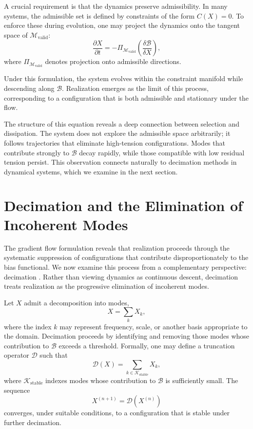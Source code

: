 \documentclass[11pt]{article}
\theoremstyle{plain}
\theoremstyle{definition}
\theoremstyle{remark}
\begin{document}
A crucial requirement is that the dynamics preserve admissibility. In many systems, the admissible set is defined by constraints of the form $C(X) = 0$. To enforce these during evolution, one may project the dynamics onto the tangent space of $\mathcal{M}_{\mathrm{valid}}$:
\[
\frac{\partial X}{\partial t} = - \Pi_{\mathcal{M}_{\mathrm{valid}}} \left( \frac{\delta \mathcal{B}}{\delta X} \right),
\]
where $\Pi_{\mathcal{M}_{\mathrm{valid}}}$ denotes projection onto admissible directions.

Under this formulation, the system evolves within the constraint manifold while descending along $\mathcal{B}$. Realization emerges as the limit of this process, corresponding to a configuration that is both admissible and stationary under the flow.

The structure of this equation reveals a deep connection between selection and dissipation. The system does not explore the admissible space arbitrarily; it follows trajectories that eliminate high-tension configurations. Modes that contribute strongly to $\mathcal{B}$ decay rapidly, while those compatible with low residual tension persist. This observation connects naturally to decimation methods in dynamical systems, which we examine in the next section.

\section{Decimation and the Elimination of Incoherent Modes}

The gradient flow formulation reveals that realization proceeds through the systematic suppression of configurations that contribute disproportionately to the bias functional. We now examine this process from a complementary perspective: decimation \cite{Grimm2026}. Rather than viewing dynamics as continuous descent, decimation treats realization as the progressive elimination of incoherent modes.

Let $X$ admit a decomposition into modes,
\[
X = \sum_{k} X_k,
\]
where the index $k$ may represent frequency, scale, or another basis appropriate to the domain. Decimation proceeds by identifying and removing those modes whose contribution to $\mathcal{B}$ exceeds a threshold. Formally, one may define a truncation operator $\mathcal{D}$ such that
\[
\mathcal{D}(X) = \sum_{k \in \mathcal{K}_{\mathrm{stable}}} X_k,
\]
where $\mathcal{K}_{\mathrm{stable}}$ indexes modes whose contribution to $\mathcal{B}$ is sufficiently small. The sequence
\[
X^{(n+1)} = \mathcal{D}(X^{(n)})
\]
converges, under suitable conditions, to a configuration that is stable under further decimation.
\end{document}
